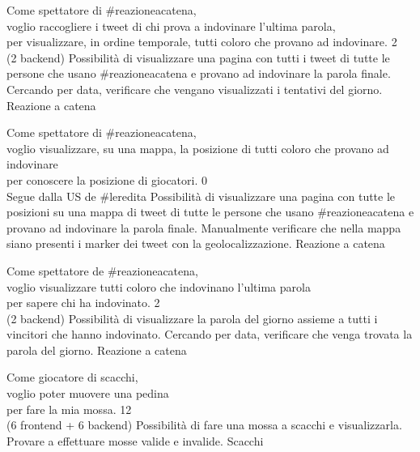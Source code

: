 \userstory%
{Come spettatore di \#reazioneacatena,\\voglio raccogliere i tweet di chi prova a indovinare l'ultima parola,\\per visualizzare, in ordine temporale, tutti coloro che provano ad indovinare.}%
{2\\(2 backend)}%
{Possibilità di visualizzare una pagina con tutti i tweet di tutte le persone che usano \#reazioneacatena e provano ad indovinare la parola finale.}%
{Cercando per data, verificare che vengano visualizzati i tentativi del giorno.}
{Reazione a catena}

\userstory%
{Come spettatore di \#reazioneacatena,\\voglio visualizzare, su una mappa, la posizione di tutti coloro che provano ad indovinare\\per conoscere la posizione di giocatori.}%
{0\\Segue dalla US de \#leredita}%
{Possibilità di visualizzare una pagina con tutte le posizioni su una mappa di tweet di tutte le persone che usano \#reazioneacatena e provano ad indovinare la parola finale.}%
{Manualmente verificare che nella mappa siano presenti i marker dei tweet con la geolocalizzazione.}
{Reazione a catena}

\userstory%
{Come spettatore de \#reazioneacatena,\\voglio visualizzare tutti coloro che indovinano l'ultima parola\\per sapere chi ha indovinato.}%
{2\\(2 backend)}%
{Possibilità di visualizzare la parola del giorno assieme a tutti i vincitori che hanno indovinato.}%
{Cercando per data, verificare che venga trovata la parola del giorno.}
{Reazione a catena}

\userstory%
{Come giocatore di scacchi,\\voglio poter muovere una pedina\\per fare la mia mossa.}%
{12\\(6 frontend + 6 backend)}%
{Possibilità di fare una mossa a scacchi e visualizzarla.}%
{Provare a effettuare mosse valide e invalide.}
{Scacchi}


\newpage
